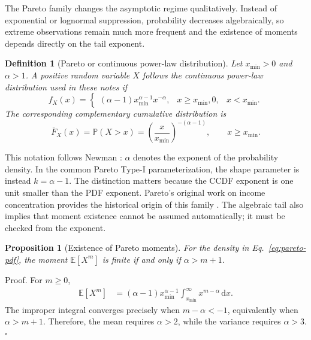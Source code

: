 \documentclass[12pt]{article}
\def\textbf#1{#1}%
\def\\{ }%
\newcommand{\dd}{{\mathrm{d}}}
\newtheorem{definition}{Definition}[section]
\newtheorem{proposition}{Proposition}[section]
\newenvironment{demonstration}
{\par\noindent\textbf{Proof.}}
{\hfill$\square$\par}
\numberwithin{equation}{section}
\begin{document}
The Pareto family changes the asymptotic regime qualitatively. Instead of exponential or lognormal suppression, probability decreases algebraically, so extreme observations remain much more frequent and the existence of moments depends directly on the tail exponent.

\begin{definition}[Pareto or continuous power-law distribution]
Let $x_{\min}>0$ and $\alpha>1$. A positive random variable $X$ follows the continuous power-law distribution used in these notes if
\begin{equation}
 f_X(x)=
 \begin{cases}
 (\alpha-1)x_{\min}^{\alpha-1}x^{-\alpha}, & x\geq x_{\min},\\
 0, & x<x_{\min}.
 \end{cases}
\label{eq:pareto-pdf}
\end{equation}
The corresponding complementary cumulative distribution is
\begin{equation}
 \overline F_X(x)=\mathbb{P}(X>x)
 =\left(\frac{x}{x_{\min}}\right)^{-(\alpha-1)},
 \qquad x\geq x_{\min}.
\label{eq:pareto-ccdf}
\end{equation}
\end{definition}

This notation follows Newman \cite{Newman2005}: $\alpha$ denotes the exponent of the probability density. In the common Pareto Type-I parameterization, the shape parameter is instead $k=\alpha-1$. The distinction matters because the CCDF exponent is one unit smaller than the PDF exponent. Pareto's original work on income concentration provides the historical origin of this family \cite{Pareto1896}. The algebraic tail also implies that moment existence cannot be assumed automatically; it must be checked from the exponent.

\begin{proposition}[Existence of Pareto moments]
For the density in Eq.~\eqref{eq:pareto-pdf}, the moment $\mathbb{E}[X^m]$ is finite if and only if $\alpha>m+1$.
\end{proposition}

\begin{demonstration}
For $m\geq0$,
\begin{align}
\mathbb{E}[X^m]
&=(\alpha-1)x_{\min}^{\alpha-1}
\int_{x_{\min}}^{\infty}x^{m-\alpha}\,\dd x.
\end{align}
The improper integral converges precisely when $m-\alpha<-1$, equivalently when $\alpha>m+1$. Therefore, the mean requires $\alpha>2$, while the variance requires $\alpha>3$.
\end{demonstration}
\end{document}
